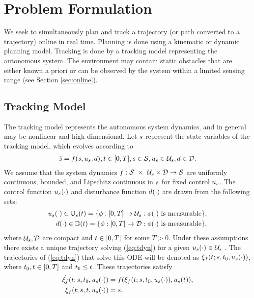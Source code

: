 \section{Problem Formulation \label{sec:formulation}}
We seek to simultaneously plan and track a trajectory (or path converted to a trajectory) online in real time. Planning is done using a kinematic or dynamic planning model. Tracking is done by a tracking model representing the autonomous system. The environment may contain static obstacles that are either known a priori or can be observed by the system within a limited sensing range (see Section \ref{sec:online}).

\subsection{Tracking Model}
The tracking model represents the autonomous system dynamics, and in general may be nonlinear and high-dimensional. Let $s$ represent the state variables of the tracking model, which evolves according to
\begin{equation}
\begin{aligned}
\label{eq:tdyn}
\dot{s} = f(s, u_s, d), t \in [0, T], s \in \mathcal{S}, u_s \in \mathcal{U}_s, d \in \mathcal{D}.
\end{aligned}
\end{equation}
We assume that the system dynamics $f : \mathcal{S}\ \times\ \mathcal{U}_s \times \mathcal{D} \rightarrow \mathcal{S}$ are uniformly continuous, bounded, and Lipschitz continuous in $s$ for fixed control $u_s$. The control function $u_s(\cdot)$ and disturbance function $d(\cdot)$ are drawn from the following sets:
\begin{equation}
\begin{aligned}
u_s(\cdot) \in \mathbb{U}_s(t) = \{\phi: [0, T] \rightarrow \mathcal{U}_s: \phi(\cdot) \text{ is measurable}\},\\
d(\cdot) \in \mathbb{D}(t) = \{\phi: [0, T] \rightarrow \mathcal{D}: \phi(\cdot) \text{ is measurable}\},
\end{aligned}
\end{equation}
where $\mathcal{U}_s, \mathcal{D}$ are compact and $t\in[0, T]$ for some $T>0$. Under these assumptions there exists a unique trajectory solving (\ref{eq:tdyn}) for a given $u_s(\cdot) \in \mathcal{U}_s$ \cite{Coddington84}. The trajectories of (\ref{eq:tdyn}) that solve this ODE will be denoted as $\xi_{f}(t; s, t_0, u_s(\cdot))$, where $t_0,t \in [0, T]$ and $t_0 \leq t$. These trajectories satisfy
\begin{equation}
\label{eq:fdyn_traj}
\begin{aligned}
\dot{\xi_{f}}(t; s, t_0, u_s(\cdot)) &= f(\xi_{f}(t; s, t_0, u_s(\cdot)), u_s(t)), \\
\xi_{f}(t; s, t, u_s(\cdot)) &= s.
\end{aligned}
\end{equation}

